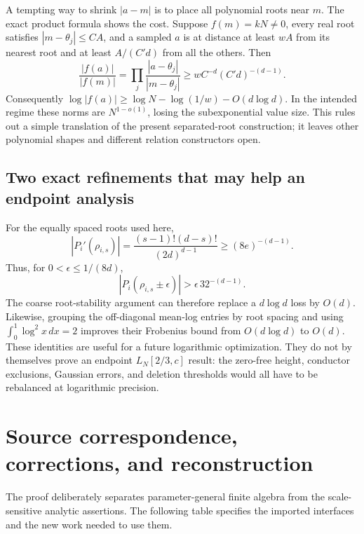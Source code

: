 A tempting way to shrink \(|a-m|\) is to place all polynomial roots
near \(m\).  The exact product formula shows the cost.  Suppose
\(f(m)=kN\ne0\), every real root satisfies
\(|m-\theta_j|\le CA\), and a sampled \(a\) is at distance at
least \(wA\) from its nearest root and at least
\(A/(C'd)\) from all the others.  Then
\[
 \frac{|f(a)|}{|f(m)|}
   =\prod_j\frac{|a-\theta_j|}{|m-\theta_j|}
   \ge wC^{-d}(C'd)^{-(d-1)}.
\]
Consequently
\(\log|f(a)|\ge\log N-\log(1/w)-O(d\log d)\).
In the intended regime these norms are \(N^{1-o(1)}\), losing
the subexponential value size.  This rules out a simple translation
of the present separated-root construction; it leaves other
polynomial shapes and different relation constructors open.

\subsection{Two exact refinements that may help an endpoint analysis}

For the equally spaced roots used here,
\[
 |P_i'(\rho_{i,s})|
   =\frac{(s-1)!(d-s)!}{(2d)^{d-1}}
   \ge(8e)^{-(d-1)}.
\]
Thus, for \(0<\epsilon\le1/(8d)\),
\[
 |P_i(\rho_{i,s}\pm\epsilon)|>
                     \epsilon\,32^{-(d-1)}.
\]
The coarse root-stability argument can therefore replace a
\(d\log d\) loss by \(O(d)\).  Likewise, grouping the
off-diagonal mean-log entries by root spacing and using
\(\int_0^1\log^2x\,dx=2\) improves their Frobenius bound from
\(O(d\log d)\) to \(O(d)\).  These identities are useful for a
future logarithmic optimization.  They do not by themselves prove
an endpoint \(L_N[2/3,c]\) result: the zero-free height, conductor
exclusions, Gaussian errors, and deletion thresholds would all
have to be rebalanced at logarithmic precision.

\appendix
\section{Source correspondence, corrections, and reconstruction}
\label{app:correspondence}

The proof deliberately separates parameter-general finite algebra
from the scale-sensitive analytic assertions.  The following table
specifies the imported interfaces and the new work needed to use them.

